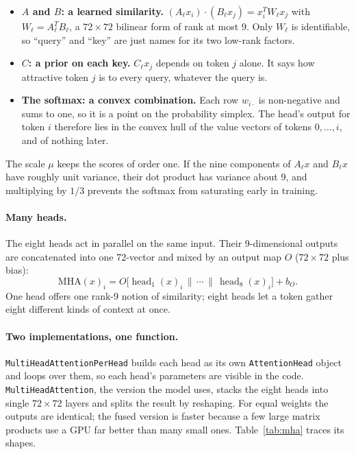 \documentclass[11pt]{article}
\newcommand{\code}[1]{\texttt{#1}}
\begin{document}
\begin{itemize}
\item \textbf{$A$ and $B$: a learned similarity.} $(A_\ell x_i)\cdot(B_\ell x_j) =
  x_i^TW_\ell x_j$ with $W_\ell=A_\ell^TB_\ell$, a $72\times72$ bilinear form of rank at
  most 9. Only $W_\ell$ is identifiable, so ``query'' and ``key'' are just names for its
  two low-rank factors.
\item \textbf{$C$: a prior on each key.} $C_\ell x_j$ depends on token $j$ alone. It
  says how attractive token $j$ is to every query, whatever the query is.
\item \textbf{The softmax: a convex combination.} Each row $w_{i\cdot}$ is non-negative
  and sums to one, so it is a point on the probability simplex. The head's output for
  token $i$ therefore lies in the convex hull of the value vectors of tokens
  $0,\dots,i$, and of nothing later.
\end{itemize}

The scale $\mu$ keeps the scores of order one. If the nine components of $A_\ell x$
and $B_\ell x$ have roughly unit variance, their dot product has variance about 9, and
multiplying by $1/3$ prevents the softmax from saturating early in training.

\paragraph{Many heads.} The eight heads act in parallel on the same input. Their
9-dimensional outputs are concatenated into one 72-vector and mixed by an output map
$O$ ($72\times72$ plus bias):
\begin{equation}
  \mathrm{MHA}(x)_i = O\big[\operatorname{head}_1(x)_i\,\|\,\cdots\,\|\,\operatorname{head}_8(x)_i\big]+b_O .
\end{equation}
One head offers one rank-9 notion of similarity; eight heads let a token gather eight
different kinds of context at once.

\paragraph{Two implementations, one function.} \code{MultiHeadAttentionPerHead} builds
each head as its own \code{AttentionHead} object and loops over them, so each head's
parameters are visible in the code. \code{MultiHeadAttention}, the version the model
uses, stacks the eight heads into single $72\times72$ layers and splits the result by
reshaping. For equal weights the outputs are identical; the fused version is faster
because a few large matrix products use a GPU far better than many small ones.
Table~\ref{tab:mha} traces its shapes.
\end{document}
